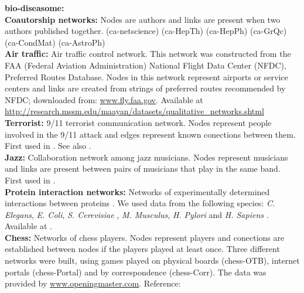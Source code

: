 \documentclass{article}
\begin{document}
\textbf{bio-diseasome:} 
\\

\textbf{Coautorship networks:} Nodes are authors and links are present when two authors published together. (ca-netscience) (ca-HepTh) (ca-HepPh) (ca-GrQc) (ca-CondMat) (ca-AstroPh)
\\

\textbf{Air traffic:} Air traffic control network. This network was constructed from the FAA (Federal Aviation Administration) National Flight Data Center (NFDC), Preferred Routes Database. Nodes in this network represent airports or service centers and links are created from strings of preferred routes recommended by NFDC; downloaded from: \url{www.fly.faa.gov}. Available at \url{http://research.mssm.edu/maayan/datasets/qualitative_networks.shtml}
\\

\textbf{Terrorist:} 9/11 terrorist communication network. Nodes represent people involved in the 9/11 attack and edges represent known conections between them. First used in \cite{Krebs2002MappingCells}. See also \cite{Tian2017ArticulationNetworks}.
\\

\textbf{Jazz:} Collaboration network among jazz musicians. Nodes represent musicians and links are present between pairs of musicians that play in the same band. First used in \cite{Gleiser2003CommunityJazz}.
\\


\textbf{Protein interaction networks:} Networks of experimentally determined interactions between proteins \cite{Xenarios2000DIP:Proteins, Xenarios2002DIPInteractions}. We used data from the following species: \emph{C. Elegans}, \emph{E. Coli}, \emph{S. Cerevisiae} \cite{Colizza2006DetectingNetworks}, \emph{M. Musculus}, \emph{H. Pylori} and \emph{H. Sapiens} \cite{Goh2006SkeletonNetworks}. Available at \cite{DIP}.
\\

\textbf{Chess:} Networks of chess players. Nodes represent players and conections are established between nodes if the players played at least once. Three different networks were built, using games played on physical boards (chess-OTB), internet portals (chess-Portal) and by correspondence (chess-Corr). The data was provided by \url{www.openingmaster.com}. Reference: \cite{Almeira2017StructurePlayers}



\end{document}
